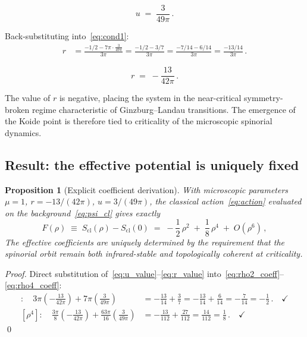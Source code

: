\documentclass[12pt,a4paper]{article}
\newtheorem{proposition}[theorem]{Proposition}
\theoremstyle{definition}
\newcommand{\Scl}{S_{\mathrm{cl}}}
\begin{document}
\begin{equation}
  \label{eq:u_value}
  \boxed{u \;=\; \frac{3}{49\pi}\,.}
\end{equation}

Back-substituting into~\eqref{eq:cond1}:
\begin{align}
  r &= \frac{-1/2 - 7\pi\cdot\frac{3}{49\pi}}{3\pi}
      = \frac{-1/2 - 3/7}{3\pi}
      = \frac{-7/14 - 6/14}{3\pi}
      = \frac{-13/14}{3\pi}\,.
\end{align}

\begin{equation}
  \label{eq:r_value}
  \boxed{r \;=\; -\frac{13}{42\pi}\,.}
\end{equation}

The value of $r$ is negative, placing the system in the
near-critical symmetry-broken regime characteristic of
Ginzburg--Landau transitions.
The emergence of the Koide point is therefore tied to
criticality of the microscopic spinorial dynamics.

\subsection{Result: the effective potential is uniquely fixed}

\begin{proposition}[Explicit coefficient derivation]
\label{prop:Frho}
With microscopic parameters $\mu = 1$, $r = -13/(42\pi)$, $u = 3/(49\pi)$,
the classical action~\eqref{eq:action} evaluated on the background~\eqref{eq:psi_cl}
gives exactly
\begin{equation}
  \label{eq:landau}
  \boxed{F(\rho)
  \;\equiv\; \Scl(\rho) - \Scl(0)
  \;=\; -\frac{1}{2}\,\rho^2 \;+\; \frac{1}{8}\,\rho^4 \;+\; O(\rho^6)\,,}
\end{equation}
The effective coefficients are uniquely determined by the requirement that
the spinorial orbit remain both infrared-stable and topologically coherent
at criticality.
\end{proposition}

\begin{proof}
Direct substitution of~\eqref{eq:u_value}--\eqref{eq:r_value}
into~\eqref{eq:rho2_coeff}--\eqref{eq:rho4_coeff}:
\begin{align*}
  [\rho^2]\colon\quad
  3\pi\!\left(-\frac{13}{42\pi}\right) + 7\pi\!\left(\frac{3}{49\pi}\right)
  &= -\frac{13}{14} + \frac{3}{7}
   = -\frac{13}{14} + \frac{6}{14}
   = -\frac{7}{14}
   = -\frac{1}{2}\,. \quad\checkmark\\[6pt]
  [\rho^4]\colon\quad
  \frac{3\pi}{8}\!\left(-\frac{13}{42\pi}\right)
  + \frac{63\pi}{16}\!\left(\frac{3}{49\pi}\right)
  &= -\frac{13}{112} + \frac{27}{112}
   = \frac{14}{112}
   = \frac{1}{8}\,. \quad\checkmark
\end{align*}
\qed
\end{proof}
\end{document}
